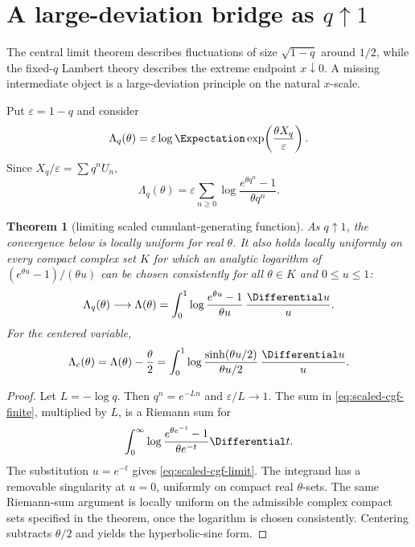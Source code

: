 \documentclass[11pt,oneside]{article}
\newtheorem{theorem}{Theorem}[section]
\theoremstyle{definition}
\theoremstyle{remark}
\newcommand{\eps}{\varepsilon}
\begin{document}
\section{A large-deviation bridge as $q\uparrow1$}
\label{sec:ldp}

The central limit theorem describes fluctuations of size $\sqrt{1-q}$ around $1/2$, while the fixed-$q$ Lambert theory describes the extreme endpoint $x\downarrow0$.  A missing intermediate object is a large-deviation principle on the natural $x$-scale.

Put $\eps=1-q$ and consider
\[
 \Lambda_q(\theta)=\eps\log\Expectation\exp\!\left(\frac{\theta X_q}{\eps}\right).
\]
Since $X_q/\eps=\sum q^nU_n$,
\begin{equation}\label{eq:scaled-cgf-finite}
 \Lambda_q(\theta)=\eps\sum_{n\ge0}
 \log\frac{e^{\theta q^n}-1}{\theta q^n}.
\end{equation}

\begin{theorem}[limiting scaled cumulant-generating function]\label{thm:scaled-cgf}
As $q\uparrow1$, the convergence below is locally uniform for real $\theta$.  It also holds locally uniformly on every compact complex set $K$ for which an analytic logarithm of $(e^{\theta u}-1)/(\theta u)$ can be chosen consistently for all $\theta\in K$ and $0\le u\le1$:
\begin{equation}\label{eq:scaled-cgf-limit}
 \Lambda_q(\theta)\longrightarrow
 \Lambda(\theta)=\int_0^1
 \log\frac{e^{\theta u}-1}{\theta u}\,\frac{\Differential u}{u}.
\end{equation}
For the centered variable,
\begin{equation}\label{eq:centered-scaled-cgf}
 \Lambda_c(\theta)=\Lambda(\theta)-\frac\theta2
 =\int_0^1\log\frac{\sinh(\theta u/2)}{\theta u/2}\,\frac{\Differential u}{u}.
\end{equation}
\end{theorem}

\begin{proof}
Let $L=-\log q$.  Then $q^n=e^{-Ln}$ and $\eps/L\to1$.  The sum in \cref{eq:scaled-cgf-finite}, multiplied by $L$, is a Riemann sum for
\[
 \int_0^\infty \log\frac{e^{\theta e^{-t}}-1}{\theta e^{-t}}\Differential t.
\]
The substitution $u=e^{-t}$ gives \cref{eq:scaled-cgf-limit}.  The integrand has a removable singularity at $u=0$, uniformly on compact real $\theta$-sets.  The same Riemann-sum argument is locally uniform on the admissible complex compact sets specified in the theorem, once the logarithm is chosen consistently.  Centering subtracts $\theta/2$ and yields the hyperbolic-sine form.
\end{proof}
\end{document}
